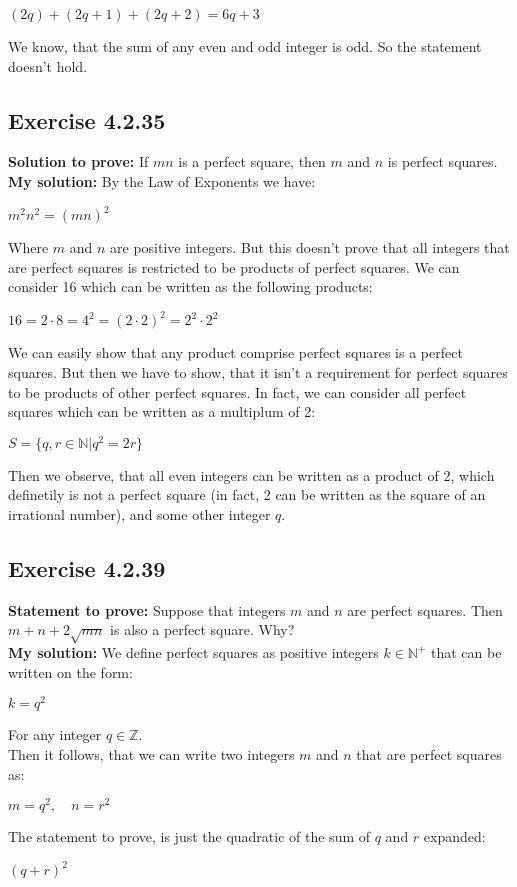 \documentclass{article}
\newcommand{\cent}[1]{\begin{center}#1\end{center}}
\newcommand{\doubleZ}{\mathbb{Z}}
\newcommand{\doubleN}{\mathbb{N}}
\newcommand{\Prove}{\textbf{Statement to prove: }}
\newcommand{\Solution}{\textbf{My solution: }}
\newcommand{\QED}{\boxed{}}
\newcommand{\Exercise}[1]{\subsection{Exercise #1}}
\begin{document}
	\cent{$(2q) + (2q+1) + (2q+2) = 6q+3$}
	
	We know, that the sum of any even and odd integer is odd. So the statement doesn't hold.
	
	\QED
	
	\Exercise{4.2.35}
	\textbf{Solution to prove:}
	If $mn$ is a perfect square, then $m$ and $n$ is perfect squares.\\
	
	\Solution
	By the Law of Exponents we have:
	\cent{$ m^2 n^2=(mn)^2$}
	
	Where $m$ and $n$ are positive integers. But this doesn't prove that all integers that are perfect squares is restricted to be products of perfect squares. We can consider 16 which can be written as the following products:
	
	\cent{$16 = 2 \cdot 8 = 4^2 = (2 \cdot 2)^2 = 2^2 \cdot 2^2$}
	
	We can easily show that any product comprise perfect squares is a perfect squares. But then we have to show, that it isn't a requirement for perfect squares to be products of other perfect squares. In fact, we can consider all perfect squares which can be written as a multiplum of 2:
	
	\cent{$S = \{q,r \in \doubleN | q^2 = 2r\}$}
	
	Then we observe, that all even integers can be written as  a product of 2, which definetily is not a perfect square (in fact, 2 can be written as the square of an irrational number), and some other integer $q$.\\
	\QED
	
	\Exercise{4.2.39}
	
	\Prove
	Suppose that integers $m$ and $n$ are perfect squares. Then $m+n+2\sqrt{mn}$ is also a perfect square. Why?\\
	
	\Solution
	We define perfect squares as positive integers $k \in \doubleN^+$ that can be written on the form:
	
 	\cent{$k = q^2$}
 	
 	For any integer $q \in \doubleZ$.\\
 	
 	Then it follows, that we can write two integers $m$ and $n$ that are perfect squares as:
 	
 	\cent{$m = q^2, \quad n = r^2$}
	
	The statement to prove, is just the quadratic of the sum of $q$ and $r$ expanded:
	 \cent{$(q+r)^2$} 
	 
\end{document}
